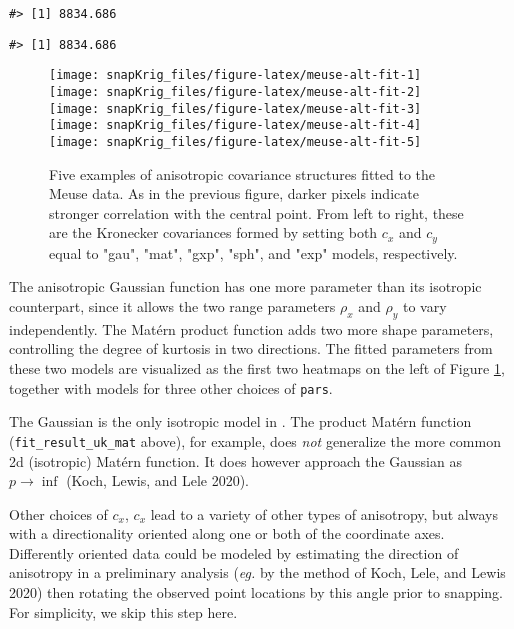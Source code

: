 \begin{verbatim}
#> [1] 8834.686
\end{verbatim}

\begin{verbatim}
#> [1] 8834.686
\end{verbatim}

\begin{figure}[!htb]
\texttt{[image: snapKrig\_files/figure-latex/meuse-alt-fit-1]} \texttt{[image: snapKrig\_files/figure-latex/meuse-alt-fit-2]} \texttt{[image: snapKrig\_files/figure-latex/meuse-alt-fit-3]} \texttt{[image: snapKrig\_files/figure-latex/meuse-alt-fit-4]} \texttt{[image: snapKrig\_files/figure-latex/meuse-alt-fit-5]} \caption{Five examples of anisotropic covariance structures fitted to the Meuse data. As in the previous figure, darker pixels indicate stronger correlation with the central point. From left to right, these are the Kronecker covariances formed by setting both $c_x$ and $c_y$ equal to "gau", "mat", "gxp", "sph", and "exp" models, respectively.}\label{fig:meuse-alt-fit}
\end{figure}

The anisotropic Gaussian function has one more parameter than its isotropic counterpart, since it allows the two range parameters \(\rho_x\) and \(\rho_y\) to vary independently. The Matérn product function adds two more shape parameters, controlling the degree of kurtosis in two directions. The fitted parameters from these two models are visualized as the first two heatmaps on the left of Figure \ref{fig:meuse-alt-fit}, together with models for three other choices of \texttt{pars}.

The Gaussian is the only isotropic model in . The product Matérn function (\texttt{fit\_result\_uk\_mat} above), for example, does \emph{not} generalize the more common 2d (isotropic) Matérn function. It does however approach the Gaussian as \(p \to \inf\) (Koch, Lewis, and Lele 2020).

Other choices of \(c_x\), \(c_x\) lead to a variety of other types of anisotropy, but always with a directionality oriented along one or both of the coordinate axes. Differently oriented data could be modeled by estimating the direction of anisotropy in a preliminary analysis (\emph{eg.} by the method of Koch, Lele, and Lewis 2020) then rotating the observed point locations by this angle prior to snapping. For simplicity, we skip this step here.

